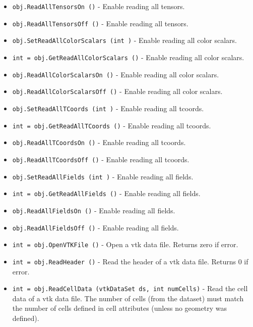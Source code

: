 \begin{itemize}
\item  \verb|obj.ReadAllTensorsOn ()| -  Enable reading all tensors. 

\item  \verb|obj.ReadAllTensorsOff ()| -  Enable reading all tensors. 

\item  \verb|obj.SetReadAllColorScalars (int )| -  Enable reading all color scalars. 

\item  \verb|int = obj.GetReadAllColorScalars ()| -  Enable reading all color scalars. 

\item  \verb|obj.ReadAllColorScalarsOn ()| -  Enable reading all color scalars. 

\item  \verb|obj.ReadAllColorScalarsOff ()| -  Enable reading all color scalars. 

\item  \verb|obj.SetReadAllTCoords (int )| -  Enable reading all tcoords. 

\item  \verb|int = obj.GetReadAllTCoords ()| -  Enable reading all tcoords. 

\item  \verb|obj.ReadAllTCoordsOn ()| -  Enable reading all tcoords. 

\item  \verb|obj.ReadAllTCoordsOff ()| -  Enable reading all tcoords. 

\item  \verb|obj.SetReadAllFields (int )| -  Enable reading all fields. 

\item  \verb|int = obj.GetReadAllFields ()| -  Enable reading all fields. 

\item  \verb|obj.ReadAllFieldsOn ()| -  Enable reading all fields. 

\item  \verb|obj.ReadAllFieldsOff ()| -  Enable reading all fields. 

\item  \verb|int = obj.OpenVTKFile ()| -  Open a vtk data file. Returns zero if error.

\item  \verb|int = obj.ReadHeader ()| -  Read the header of a vtk data file. Returns 0 if error.

\item  \verb|int = obj.ReadCellData (vtkDataSet ds, int numCells)| -  Read the cell data of a vtk data file. The number of cells (from the 
 dataset) must match the number of cells defined in cell attributes (unless
 no geometry was defined).


\end{itemize}
